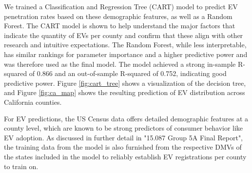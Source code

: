 \documentclass[12pt, letterpaper]{article}
\begin{document}
We trained a Classification and Regression Tree (CART) model to predict EV penetration rates based on these demographic features, as well as a Random Forest. The CART model is shown to help understand the major factors that indicate the quantity of EVs per county and confirm that these align with other research and intuitive expectations. The Random Forest, while less interpretable, has similar rankings for parameter importance and a higher predictive power and was therefore used as the final model. The model achieved a strong in-sample R-squared of 0.866 and an out-of-sample R-squared of 0.752, indicating good predictive power. Figure \ref{fig:cart_tree} shows a visualization of the decision tree, and Figure \ref{fig:ca_map} shows the resulting prediction of EV distribution across California counties.

For EV predictions, the US Census data offers detailed demographic features at a county level, which are known to be strong predictors of consumer behavior like EV adoption. As discussed in further detail in "15.087 Group 5A Final Report", the training data from the model is also furnished from the respective DMVs of the states included in the model to reliably establish EV registrations per county to train on.
\end{document}

